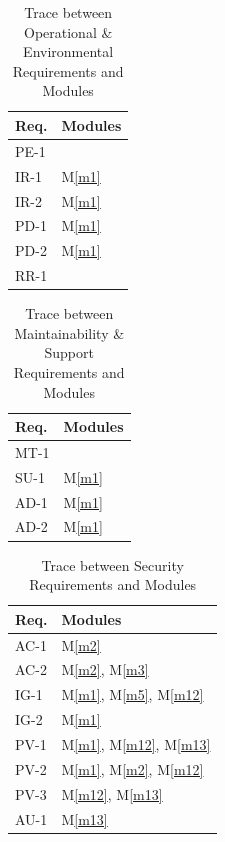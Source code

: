 \documentclass[12pt, titlepage]{article}
\newcommand{\mref}[1]{M\ref{#1}}
\begin{document}
\begin{table}[H]
\centering
\begin{tabular}{p{} p{}}
\toprule
\textbf{Req.} & \textbf{Modules}\\
\midrule
PE-1 & \\
IR-1 & \mref{m1} \\
IR-2 & \mref{m1} \\
PD-1 & \mref{m1} \\
PD-2 & \mref{m1} \\
RR-1 &  \\
\bottomrule
\end{tabular}
\caption{Trace between Operational \& Environmental Requirements and Modules}
\label{TblRT_OpEnv}
\end{table}

\begin{table}[H]
\centering
\begin{tabular}{p{} p{}}
\toprule
\textbf{Req.} & \textbf{Modules}\\
\midrule
MT-1 & \\
SU-1 & \mref{m1} \\
AD-1 & \mref{m1} \\
AD-2 & \mref{m1} \\
\bottomrule
\end{tabular}
\caption{Trace between Maintainability \& Support Requirements and Modules}
\label{TblRT_Maintain}
\end{table}

\begin{table}[H]
\centering
\begin{tabular}{p{} p{}}
\toprule
\textbf{Req.} & \textbf{Modules}\\
\midrule
AC-1 & \mref{m2} \\
AC-2 & \mref{m2}, \mref{m3} \\
IG-1 & \mref{m1}, \mref{m5}, \mref{m12} \\
IG-2 & \mref{m1} \\
PV-1 & \mref{m1}, \mref{m12}, \mref{m13} \\
PV-2 & \mref{m1}, \mref{m2}, \mref{m12} \\
PV-3 & \mref{m12}, \mref{m13} \\
AU-1 & \mref{m13} \\
\bottomrule
\end{tabular}
\caption{Trace between Security Requirements and Modules}
\label{TblRT_Security}
\end{table}
\end{document}
